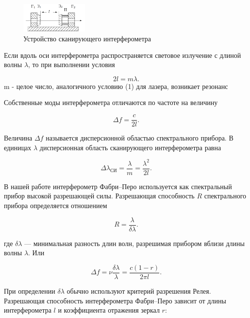 \documentclass[a4paper, 12pt]{article}%
\begin{document}
	
	\begin{figure}[H]
		\begin{center}
			\includegraphics[width=0.3\textwidth]{Ф-П.png}
			\caption{Устройство сканирующего интерферометра}
		\end{center}
	\end{figure}
	
	Если вдоль оси интерферометра распространяется световое излучение с длиной волны $\lambda$, то при выполнении условия
	
	\begin{equation}
		2l = m \lambda.
	\end{equation}
	m - целое число, аналогичного условию (1) для лазера, возникает резонанс
	
	Собственные моды интерферометра отличаются по частоте на величину
	
	\begin{equation}
		\Delta f = \frac{c}{2l}.
	\end{equation}

Величина $\Delta f$ называется дисперсионной областью спектрального прибора. В единицах $\lambda$ дисперсионная область сканирующего интерферометра равна
	
	
		\begin{equation}
		\Delta \lambda_\text{СИ} = \frac{\lambda}{m} = \frac{\lambda ^ 2}{2l}.
	\end{equation}
	
	В нашей работе интерферометр Фабри–Перо используется как спектральный прибор высокой разрешающей силы. Разрешающая способность $R$ спектрального прибора определяется отношением
	
	\begin{equation}
		R = \frac{\lambda}{\delta \lambda}.
	\end{equation}
	
	
	где $\delta \lambda$ — минимальная разность длин волн, разрешимая прибором вблизи длины волны $\lambda$. Или
	
		\begin{equation}
		\Delta f = \nu \frac{\delta\lambda}{\lambda} = \frac{c (1- r)}{2\pi l}.
	\end{equation}
	
	
	
	При определении $\delta \lambda$ обычно используют критерий разрешения Релея. Разрешающая способность интерферометра Фабри–Перо зависит от длины интерферометра $l$ и
	коэффициента отражения зеркал $r$:
	
\end{document}

